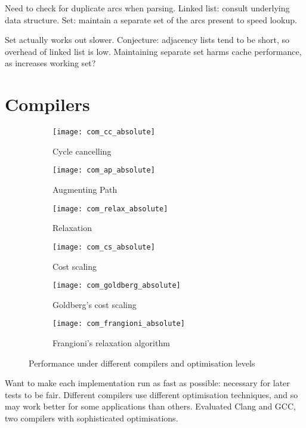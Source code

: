 Need to check for duplicate arcs when parsing. Linked list: consult underlying data structure. Set: maintain a separate set of the arcs present to speed lookup.

Set actually works out slower. Conjecture: adjacency lists tend to be short, so overhead of linked list is low. Maintaining separate set harms cache performance, as increases working set?


\section{Compilers}

\begin{figure}
    \centering
    \begin{subfigure}[c]{0.45\textwidth}
        \texttt{[image: com\_cc\_absolute]}
        \caption{Cycle cancelling}
    \end{subfigure}
    \begin{subfigure}[c]{0.45\textwidth}
        \texttt{[image: com\_ap\_absolute]}
        \caption{Augmenting Path}
    \end{subfigure}
    \begin{subfigure}[c]{0.45\textwidth}
        \texttt{[image: com\_relax\_absolute]}
        \caption{Relaxation}
    \end{subfigure}
    \begin{subfigure}[c]{0.45\textwidth}
        \texttt{[image: com\_cs\_absolute]}
        \caption{Cost scaling}
    \end{subfigure}
    \begin{subfigure}[c]{0.45\textwidth}
        \texttt{[image: com\_goldberg\_absolute]}
        \caption{Goldberg's cost scaling}
    \end{subfigure}
    \begin{subfigure}[c]{0.45\textwidth}
        \texttt{[image: com\_frangioni\_absolute]}
        \caption{Frangioni's relaxation algorithm}
    \end{subfigure}
    \caption{Performance under different compilers and optimisation levels}
    \label{fig:compilers}
\end{figure}

Want to make each implementation run as fast as possible: necessary for later tests to be fair. Different compilers use different optimisation techniques, and so may work better for some applications than others. Evaluated Clang and GCC, two compilers with sophisticated optimisations.

